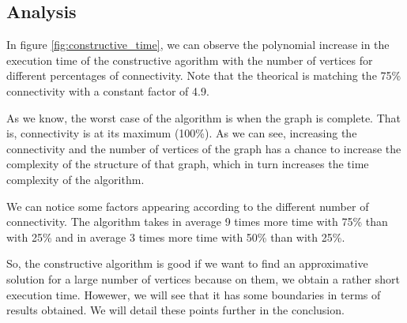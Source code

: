 
\subsection{Analysis}

In figure \ref{fig:constructive_time}, we can observe the polynomial increase in the execution time of the constructive agorithm with the number of vertices for different percentages of connectivity. Note that the theorical is matching the 75\% connectivity with a constant factor of 4.9.
\bigskip

As we know, the worst case of the algorithm is when the graph is complete. That is, connectivity is at its maximum (100\%). As we can see, increasing the connectivity and the number of vertices of the graph has a chance to increase the complexity of the structure of that graph, which in turn increases the time complexity of the algorithm. 
\bigskip

We can notice some factors appearing according to the different number of connectivity. The algorithm takes in average 9 times more time with 75\% than with 25\% and in average 3 times more time with 50\% than with 25\%.
\bigskip

So, the constructive algorithm is good if we want to find an approximative solution for a large number of vertices because on them, we obtain a rather short execution time. Howewer, we will see that it has some boundaries in terms of results obtained. We will detail these points further in the conclusion.